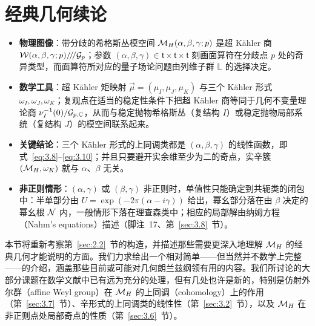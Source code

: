 

\section{经典几何续论}

\label{sec:3}

\begin{keytakeaways}
  \begin{itemize}[leftmargin=1.4em,itemsep=2pt,topsep=2pt]
    \item \textbf{物理图像}：带分歧的希格斯丛模空间 ${{\mathcal{M}}_H}(\alpha,\beta,\gamma;p)$ 是超 Kähler 商 $\mathcal{W}(\alpha,\beta,\gamma;p)/\negthinspace/\negthinspace/\mathcal{G}_p$；参数 $(\alpha,\beta,\gamma)\in\mathfrak t\times\mathfrak t\times\mathfrak t$ 刻画面算符在分歧点 $p$ 处的奇异类型，而面算符所对应的量子场论问题由列维子群 $\mathbb{L}$ 的选择决定。
    \item \textbf{数学工具}：超 Kähler 矩映射 $\vec\mu=(\mu_I,\mu_J,\mu_K)$ 与三个 Kähler 形式 $\omega_I,\omega_J,\omega_K$；复观点在适当的稳定性条件下把超 Kähler 商等同于几何不变量理论商 $\nu_I^{-1}(0)/\mathcal{G}_{p,{\mathbb{C}}}$，从而与稳定抛物希格斯丛（复结构 $I$）或稳定抛物局部系统（复结构 $J$）的模空间联系起来。
    \item \textbf{关键结论}：三个 Kähler 形式的上同调类都是 $(\alpha,\beta,\gamma)$ 的线性函数，即式~\eqref{eq:3.8}--\eqref{eq:3.10}；并且只要避开实余维至少为二的奇点，实辛簇 $({{\mathcal{M}}_H},\omega_K)$ 就与 $\alpha$、$\beta$ 无关。
    \item \textbf{非正则情形}：$(\alpha,\gamma)$ 或 $(\beta,\gamma)$ 非正则时，单值性只能确定到共轭类的闭包中：半单部分由 $U=\exp(-2\pi(\alpha-i\gamma))$ 给出，幂幺部分落在由 $\beta$ 决定的幂幺根 $\mathcal{N}$ 内，一般情形下落在理查森类中；相应的局部解由纳姆方程（Nahm's equations）描述（脚注~17、第~\ref{sec:3.8}~节）。
  \end{itemize}
\end{keytakeaways}

本节将重新考察第~\ref{sec:2.2}~节的构造，并描述那些需要更深入地理解 ${{\mathcal{M}}_H}$ 的经典几何才能说明的方面。我们力求给出一个相对简单——但当然并不数学上完整——的介绍，涵盖那些目前或可能对几何朗兰兹纲领有用的内容。我们所讨论的大部分课题在数学文献中已有远为充分的处理，但有几处也许是新的，特别是仿射外尔群（affine Weyl group）在 ${{\mathcal{M}}_H}$ 的上同调（cohomology）上的作用（第~\ref{sec:3.7}~节）、辛形式的上同调类的线性性（第~\ref{sec:3.2}~节），以及 ${{\mathcal{M}}_H}$ 在非正则点处局部奇点的性质（第~\ref{sec:3.6}~节）。

